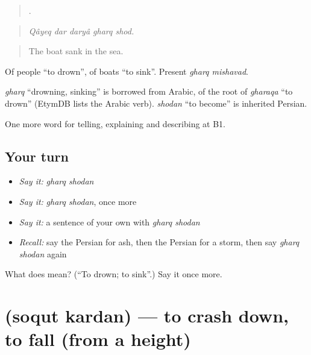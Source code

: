 \begin{quote}
    .
\end{quote}

\begin{quote}
\emph{Qâyeq dar daryâ gharq shod.}
\end{quote}

\begin{quote}
The boat sank in the sea.
\end{quote}

Of people \textquotedblleft{}to drown\textquotedblright{}, of boats \textquotedblleft{}to sink\textquotedblright{}. Present \emph{gharq mishavad}.

\begin{cousinweb}
\emph{gharq} \textquotedblleft{}drowning, sinking\textquotedblright{} is borrowed from Arabic, of the root of \emph{gharaqa} \textquotedblleft{}to drown\textquotedblright{} (EtymDB lists the Arabic verb). \emph{shodan} \textquotedblleft{}to become\textquotedblright{} is inherited Persian.
\end{cousinweb}

\begin{grammarlens}[title={What you've built}]
One more word for telling, explaining and describing at B1.
\end{grammarlens}

\subsection*{Your turn}
\begin{itemize}
\raggedright
  \item \emph{Say it:} \emph{gharq shodan}
  \item \emph{Say it:} \emph{gharq shodan}, once more
  \item \emph{Say it:} a sentence of your own with \emph{gharq shodan}
  \item \emph{Recall:} say the Persian for ash, then the Persian for a storm, then say \emph{gharq shodan} again
\end{itemize}

\begin{tcolorbox}[breakable,colback=teal!4,colframe=teal!35!black,title={Before you move on}]
What does   mean? (\textquotedblleft{}To drown; to sink\textquotedblright{}.) Say it once more.
\end{tcolorbox}
\section[\texorpdfstring{\fa{سقوط} \fa{کردن} (soqut kardan)}{سقوط کردن (soqut kardan)}]{  (soqut kardan) — to crash down, to fall (from a height)}

